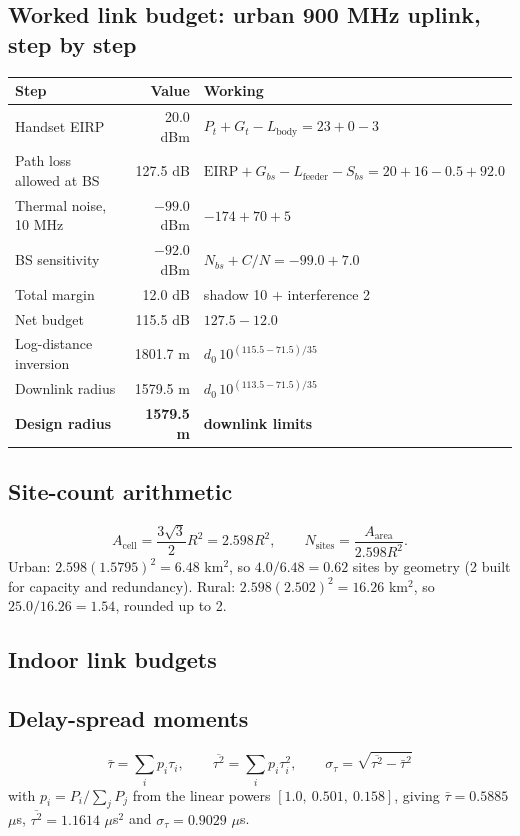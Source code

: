 \documentclass[9pt,a4paper]{article}
\begin{document}
\subsection{Worked link budget: urban 900 MHz uplink, step by step}
\begin{center}\small
\begin{tabular}{@{}lrl@{}}
\toprule
\textbf{Step} & \textbf{Value} & \textbf{Working} \\
\midrule
Handset EIRP & 20.0 dBm & $P_t + G_t - L_{\text{body}} = 23 + 0 - 3$ \\
Path loss allowed at BS & 127.5 dB & $\text{EIRP} + G_{bs} - L_{\text{feeder}} - S_{bs} = 20 + 16 - 0.5 + 92.0$ \\
Thermal noise, 10 MHz & $-99.0$ dBm & $-174 + 70 + 5$ \\
BS sensitivity & $-92.0$ dBm & $N_{bs} + C/N = -99.0 + 7.0$ \\
Total margin & 12.0 dB & shadow 10 + interference 2 \\
Net budget & 115.5 dB & $127.5 - 12.0$ \\
Log-distance inversion & 1801.7 m & $d_0\,10^{(115.5-71.5)/35}$ \\
Downlink radius & 1579.5 m & $d_0\,10^{(113.5-71.5)/35}$ \\
\textbf{Design radius} & \textbf{1579.5 m} & \textbf{downlink limits} \\
\bottomrule
\end{tabular}
\end{center}

\subsection{Site-count arithmetic}
\[
A_{\text{cell}} = \frac{3\sqrt3}{2}R^2 = 2.598R^2,\qquad
N_{\text{sites}} = \frac{A_{\text{area}}}{2.598R^2}.
\]
Urban: $2.598(1.5795)^2 = 6.48$ km$^2$, so $4.0/6.48 = 0.62$ sites by geometry (2 built for
capacity and redundancy). Rural: $2.598(2.502)^2 = 16.26$ km$^2$, so $25.0/16.26 = 1.54$, rounded
up to 2.

\subsection{Indoor link budgets}

\subsection{Delay-spread moments}
\[
\bar\tau = \sum_i p_i\tau_i,\qquad
\overline{\tau^2} = \sum_i p_i\tau_i^2,\qquad
\sigma_\tau = \sqrt{\overline{\tau^2}-\bar\tau^2}
\]
with $p_i = P_i/\sum_j P_j$ from the linear powers $[1.0,\ 0.501,\ 0.158]$, giving
$\bar\tau=0.5885$ $\mu$s, $\overline{\tau^2}=1.1614$ $\mu$s$^2$ and
$\sigma_\tau=0.9029$ $\mu$s.
\end{document}
